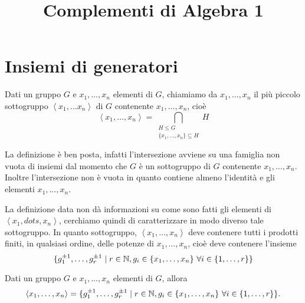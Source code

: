 \documentclass[11pt]{scrartcl}
\begin{document}
\title{Complementi di Algebra 1}
\maketitle
\newpage

\tableofcontents
\eject

\newpage

\section{Insiemi di generatori}

\begin{definition}
    Dati un gruppo $G$ e $x_1, \dots, x_n$ elementi di $G$, chiamiamo  da $x_1, \dots, x_n$ il più piccolo sottogruppo $\left< x_1, \dots x_n
    \right>$ di $G$ contenente $x_1, \dots, x_n$, cioè \[\left<x_1, \dots, x_n\right> =
    \bigcap_{\substack{H\leq G\\ \{x_1, \dots, x_n\} \subseteq H}} H\] 
\end{definition}

\begin{remark}
    La definizione è ben posta, infatti l'intersezione avviene su una 
    famiglia non vuota di insiemi dal momento che $G$ è un sottogruppo di 
    $G$ contenente $x_1, \dots, x_n$. Inoltre l'intersezione non è vuota in 
    quanto contiene almeno l'identità e gli elementi $x_1, \dots, x_n$.
\end{remark}

La definizione data non dà informazioni su come sono fatti gli elementi di 
$\left<x_1, dots, x_n\right>$, cerchiamo quindi di caratterizzare in modo
diverso tale sottogruppo. In quanto sottogruppo, $\left<x_1, \dots, x_n\right>$
deve contenere tutti i prodotti finiti, in qualsiasi ordine, delle potenze di
$x_1, \dots, x_n$, cioè deve contenere l'insieme 
\[\{g_1^{\pm 1}, \dots, g_r^{\pm 1}\mid r \in \mathbb N, g_i \in \{x_1, \dots, x_n\}
~\forall i \in \{1, \dots, r\}\}\]

\begin{proposition}
\label{prop1.0}
Dati un gruppo $G$ e $x_1, \dots, x_n$ elementi di $G$, allora \[
    \left<x_1, \dots, x_n\right> = \{g_1^{\pm 1}, \dots, g_r^{\pm 1}\mid r 
    \in \mathbb N, g_i \in \{x_1, \dots, x_n\}~\forall i \in \{1, \dots, r\}\}.
    \]
\end{proposition}
\end{document}
